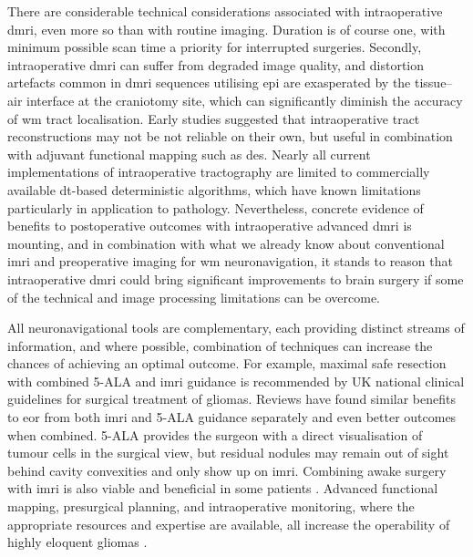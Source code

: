There are considerable technical considerations associated with intraoperative \gls{dmri}, even more so than with routine imaging.
Duration is of course one, with minimum possible scan time a priority for interrupted surgeries.
Secondly, intraoperative \gls{dmri} can suffer from degraded image quality\autocite{Roder2019}, and distortion artefacts common in \gls{dmri} sequences utilising \gls{epi} are exasperated by the tissue--air interface at the craniotomy site\autocite{Elliott2020}, which can significantly diminish the accuracy of \gls{wm} tract localisation\autocite{Yang2022}.
Early studies suggested that intraoperative tract reconstructions may not be not reliable on their own, but useful in combination with adjuvant functional mapping such as \gls{des}\autocite{Ostry2013}.
Nearly all current implementations of intraoperative tractography are limited to commercially available \gls{dt}-based deterministic algorithms, which have known limitations particularly in application to pathology.
Nevertheless, concrete evidence of benefits to postoperative outcomes with intraoperative advanced \gls{dmri} is mounting\autocite{DAndrea2012,Cui2015,Maesawa2010}, and in combination with what we already know about conventional \gls{imri} and preoperative imaging for \gls{wm} neuronavigation, it stands to reason that intraoperative \gls{dmri} could bring significant improvements to brain surgery if some of the technical and image processing limitations can be overcome.

All neuronavigational tools are complementary, each providing distinct streams of information, and where possible, combination of techniques can increase the chances of achieving an optimal outcome.
For example, maximal safe resection with combined 5-ALA and \gls{imri} guidance is recommended by UK national clinical guidelines for surgical treatment of gliomas\autocite{NICE2021}. 
Reviews have found similar benefits to \gls{eor} from both \gls{imri} and 5-ALA guidance separately\autocite{Golub2020} and even better outcomes when combined\autocite{Nickel2018,Coburger2019}.
5-ALA provides the surgeon with a direct visualisation of tumour cells in the surgical view, but residual nodules may remain out of sight behind cavity convexities and only show up on \gls{imri}\autocite{SueroMolina2019}.
Combining awake surgery with \gls{imri} is also viable and beneficial in some patients \autocite{Motomura2017,Tuleasca2021}.
Advanced functional mapping, presurgical planning, and intraoperative monitoring, where the appropriate resources and expertise are available\autocite{GeorgeZakiGhali2020}, all increase the operability of highly eloquent gliomas
\autocite{Bello2008,Krieg2013,DellaPuppa2013b,Magill2018}.
